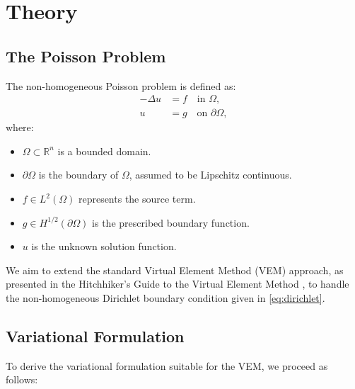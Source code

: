 \documentclass[class=article, crop=false]{standalone}
\begin{document}
\section{Theory}

\subsection{The Poisson Problem}

The non-homogeneous Poisson problem is defined as:
\begin{align}
    -\Delta u &= f \quad \text{in } \Omega, \label{eq:poisson}\\
    u &= g \quad \text{on } \partial \Omega, \label{eq:dirichlet}
\end{align}
where:
\begin{itemize}
    \item $\Omega \subset \mathbb{R}^n$ is a bounded domain.
    \item $\partial\Omega$ is the boundary of $\Omega$, assumed to be Lipschitz continuous.
    \item $f \in L^2(\Omega)$ represents the source term.
    \item $g \in H^{1/2}(\partial\Omega)$ is the prescribed boundary function.
    \item $u$ is the unknown solution function.
\end{itemize}

We aim to extend the standard Virtual Element Method (VEM) approach, as presented in the Hitchhiker's Guide to the Virtual Element Method \cite{beirao2014hitchhiker}, to handle the non-homogeneous Dirichlet boundary condition given in \eqref{eq:dirichlet}.

\subsection{Variational Formulation}

To derive the variational formulation suitable for the VEM, we proceed as follows:
\end{document}
